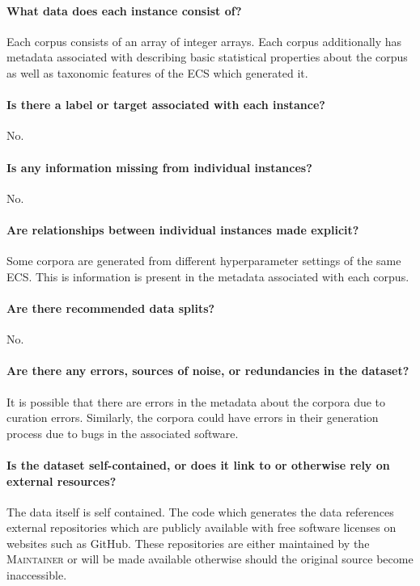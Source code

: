 \documentclass{article}
\newcommand\M{\textsc{Maintainer}}
\begin{document}
\paragraph{What data does each instance consist of?}
Each corpus consists of an array of integer arrays.
Each corpus additionally has metadata associated with describing basic statistical properties about the corpus as well as taxonomic features of the ECS which generated it.

\paragraph{Is there a label or target associated with each instance?}
No.

\paragraph{Is any information missing from individual instances?}
No.

\paragraph{Are relationships between individual instances made explicit?}
Some corpora are generated from different hyperparameter settings of the same ECS\@.
This is information is present in the metadata associated with each corpus.

\paragraph{Are there recommended data splits?}
No.

\paragraph{Are there any errors, sources of noise, or redundancies in the dataset?}
It is possible that there are errors in the metadata about the corpora due to curation errors.
Similarly, the corpora could have errors in their generation process due to bugs in the associated software.

\paragraph{Is the dataset self-contained, or does it link to or otherwise rely on external resources?}
The data itself is self contained.
The code which generates the data references external repositories which are publicly available with free software licenses on websites such as GitHub.
These repositories are either maintained by the \M{} or will be made available otherwise should the original source become inaccessible.
\end{document}
